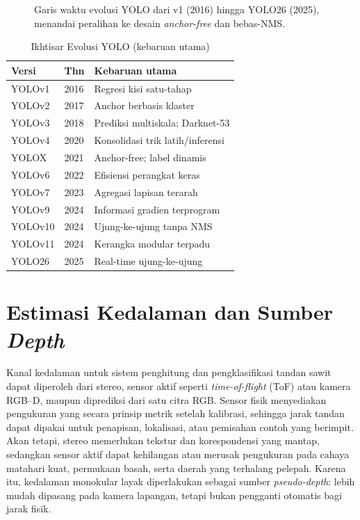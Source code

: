 \begin{figure}[t]
\centering
{}
\caption{Garis waktu evolusi YOLO dari v1 (2016) hingga YOLO26 (2025),
menandai peralihan ke desain \textit{anchor-free} dan bebas-NMS.}
\label{fig:timeline}
\end{figure}

\begin{table}[t]
\centering
\caption{Ikhtisar Evolusi YOLO (kebaruan utama)}
\label{tab:yolo}
\begin{tabular}{@{}llp{4.4cm}@{}}
\toprule
\textbf{Versi} & \textbf{Thn} & \textbf{Kebaruan utama} \\
\midrule
YOLOv1 & 2016 & Regresi kisi satu-tahap \\
YOLOv2 & 2017 & Anchor berbasis klaster \\
YOLOv3 & 2018 & Prediksi multiskala; Darknet-53 \\
YOLOv4 & 2020 & Konsolidasi trik latih/inferensi \\
YOLOX & 2021 & Anchor-free; label dinamis \\
YOLOv6 & 2022 & Efisiensi perangkat keras \\
YOLOv7 & 2023 & Agregasi lapisan terarah \\
YOLOv9 & 2024 & Informasi gradien terprogram \\
YOLOv10 & 2024 & Ujung-ke-ujung tanpa NMS \\
YOLOv11 & 2024 & Kerangka modular terpadu \\
YOLO26 & 2025 & Real-time ujung-ke-ujung \\
\bottomrule
\end{tabular}
\end{table}


\section{Estimasi Kedalaman dan Sumber \textit{Depth}}\label{sec:depth}
Kanal kedalaman untuk sistem penghitung dan pengklasifikasi tandan sawit dapat diperoleh dari stereo, sensor aktif seperti \textit{time-of-flight} (ToF) atau kamera RGB--D, maupun diprediksi dari satu citra RGB. Sensor fisik menyediakan pengukuran yang secara prinsip metrik setelah kalibrasi, sehingga jarak tandan dapat dipakai untuk penapisan, lokalisasi, atau pemisahan contoh yang berimpit. Akan tetapi, stereo memerlukan tekstur dan korespondensi yang mantap, sedangkan sensor aktif dapat kehilangan atau merusak pengukuran pada cahaya matahari kuat, permukaan basah, serta daerah yang terhalang pelepah. Karena itu, kedalaman monokular layak diperlakukan sebagai sumber \textit{pseudo-depth}: lebih mudah dipasang pada kamera lapangan, tetapi bukan pengganti otomatis bagi jarak fisik.

